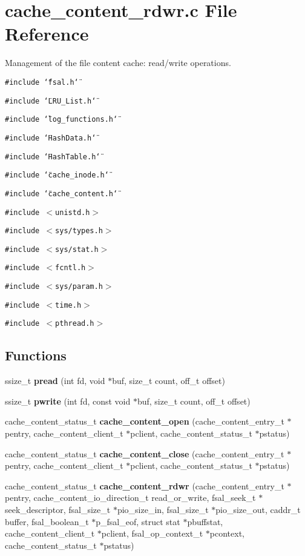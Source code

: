 \section{cache\_\-content\_\-rdwr.c File Reference}
\label{cache__content__rdwr_8c}
Management of the file content cache: read/write operations. 

{\tt \#include \char`\"{}fsal.h\char`\"{}}\par
{\tt \#include \char`\"{}LRU\_\-List.h\char`\"{}}\par
{\tt \#include \char`\"{}log\_\-functions.h\char`\"{}}\par
{\tt \#include \char`\"{}Hash\-Data.h\char`\"{}}\par
{\tt \#include \char`\"{}Hash\-Table.h\char`\"{}}\par
{\tt \#include \char`\"{}cache\_\-inode.h\char`\"{}}\par
{\tt \#include \char`\"{}cache\_\-content.h\char`\"{}}\par
{\tt \#include $<$unistd.h$>$}\par
{\tt \#include $<$sys/types.h$>$}\par
{\tt \#include $<$sys/stat.h$>$}\par
{\tt \#include $<$fcntl.h$>$}\par
{\tt \#include $<$sys/param.h$>$}\par
{\tt \#include $<$time.h$>$}\par
{\tt \#include $<$pthread.h$>$}\par
\subsection*{Functions}
\begin{CompactItemize}
\item 
ssize\_\-t {\bf pread} (int fd, void $\ast$buf, size\_\-t count, off\_\-t offset)
\item 
ssize\_\-t {\bf pwrite} (int fd, const void $\ast$buf, size\_\-t count, off\_\-t offset)
\item 
cache\_\-content\_\-status\_\-t {\bf cache\_\-content\_\-open} (cache\_\-content\_\-entry\_\-t $\ast$pentry, cache\_\-content\_\-client\_\-t $\ast$pclient, cache\_\-content\_\-status\_\-t $\ast$pstatus)
\item 
cache\_\-content\_\-status\_\-t {\bf cache\_\-content\_\-close} (cache\_\-content\_\-entry\_\-t $\ast$pentry, cache\_\-content\_\-client\_\-t $\ast$pclient, cache\_\-content\_\-status\_\-t $\ast$pstatus)
\item 
cache\_\-content\_\-status\_\-t {\bf cache\_\-content\_\-rdwr} (cache\_\-content\_\-entry\_\-t $\ast$pentry, cache\_\-content\_\-io\_\-direction\_\-t read\_\-or\_\-write, fsal\_\-seek\_\-t $\ast$seek\_\-descriptor, fsal\_\-size\_\-t $\ast$pio\_\-size\_\-in, fsal\_\-size\_\-t $\ast$pio\_\-size\_\-out, caddr\_\-t buffer, fsal\_\-boolean\_\-t $\ast$p\_\-fsal\_\-eof, struct stat $\ast$pbuffstat, cache\_\-content\_\-client\_\-t $\ast$pclient, fsal\_\-op\_\-context\_\-t $\ast$pcontext, cache\_\-content\_\-status\_\-t $\ast$pstatus)
\end{CompactItemize}


